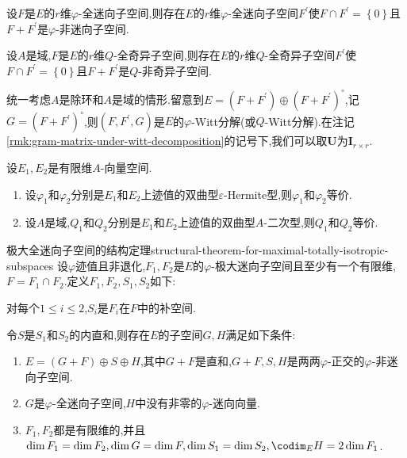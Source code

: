 \begin{corollary}{}{}
	设$F$是$E$的$r$维$\varphi$-全迷向子空间,则存在$E$的$r$维$\varphi$-全迷向子空间$F^{\prime}$使$F\cap F^{\prime}=\left\{0\right\}$且$F+F^{\prime}$是$\varphi$-非迷向子空间.
\end{corollary}

\begin{corollary}{}{}
	设$A$是域,$F$是$E$的$r$维$Q$-全奇异子空间,则存在$E$的$r$维$Q$-全奇异子空间$F^{\prime}$使$F\cap F^{\prime}=\left\{0\right\}$且$F+F^{\prime}$是$Q$-非奇异子空间.
\end{corollary}

\begin{remark}{}{}
	统一考虑$A$是除环和$A$是域的情形.留意到$E=\left(F+F^{\prime}\right)\oplus\left(F+F^{\prime}\right)^{\circ}$,记$G=\left(F+F^{\prime}\right)^{\circ}$,则$\left(F,F^{\prime},G\right)$是$E$的$\varphi$-Witt分解(或$Q$-Witt分解).在注记\ref{rmk:gram-matrix-under-witt-decomposition}的记号下,我们可以取$\boldsymbol{U}$为$\boldsymbol{I}_{r\times r}$.
\end{remark}

\begin{corollary}{}{}
	设$E_{1},E_{2}$是有限维$A$-向量空间.
	\begin{enumerate}
		\item 设$\varphi_{1}$和$\varphi_{2}$分别是$E_{1}$和$E_{2}$上迹值的双曲型$\varepsilon$-Hermite型,则$\varphi_{1}$和$\varphi_{2}$等价.
		\item 设$A$是域,$Q_{1}$和$Q_{2}$分别是$E_{1}$和$E_{2}$上迹值的双曲型$A$-二次型,则$Q_{1}$和$Q_{2}$等价.
	\end{enumerate}
\end{corollary}

\begin{proposition}{极大全迷向子空间的结构定理}{structural-theorem-for-maximal-totally-isotropic-subspaces}
	设$\varphi$迹值且非退化,$F_{1},F_{2}$是$E$的$\varphi$-极大迷向子空间且至少有一个有限维,$F=F_{1}\cap F_{2}$.定义$F_{1},F_{2},S_{1},S_{2}$如下:
	\begin{center}
		对每个$1\leq i\leq 2$,$S_{i}$是$F_{i}$在$F$中的补空间.
	\end{center}
	令$S$是$S_{1}$和$S_{2}$的内直和,则存在$E$的子空间$G,H$满足如下条件:
	\begin{enumerate}
		\item $E=\left(G+F\right)\oplus S\oplus H$,其中$G+F$是直和,$G+F,S,H$是两两$\varphi$-正交的$\varphi$-非迷向子空间.
		\item $G$是$\varphi$-全迷向子空间,$H$中没有非零的$\varphi$-迷向向量.
		\item $F_{1},F_{2}$都是有限维的,并且$\dim F_{1}=\dim F_{2},\dim G=\dim F,\dim S_{1}=\dim S_{2},\codim_{E}H=2\dim F_{1}$.
	\end{enumerate}
\end{proposition}

